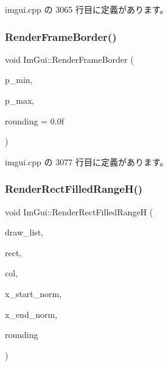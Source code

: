 imgui.\+cpp の 3065 行目に定義があります。

\mbox{\label{namespace_im_gui_adc76239c2006e66f8dab7638529a763d}} 
\subsubsection{\texorpdfstring{Render\+Frame\+Border()}{RenderFrameBorder()}}
{\footnotesize\ttfamily void Im\+Gui\+::\+Render\+Frame\+Border (\begin{DoxyParamCaption}\item[{\mbox{\hyperlink{struct_im_vec2}{Im\+Vec2}}}]{p\+\_\+min,  }\item[{\mbox{\hyperlink{struct_im_vec2}{Im\+Vec2}}}]{p\+\_\+max,  }\item[{float}]{rounding = {\ttfamily 0.0f} }\end{DoxyParamCaption})}



 imgui.\+cpp の 3077 行目に定義があります。

\mbox{\label{namespace_im_gui_af311762331bda4508b25e05f6afc7f45}} 
\subsubsection{\texorpdfstring{Render\+Rect\+Filled\+Range\+H()}{RenderRectFilledRangeH()}}
{\footnotesize\ttfamily void Im\+Gui\+::\+Render\+Rect\+Filled\+RangeH (\begin{DoxyParamCaption}\item[{\mbox{\hyperlink{struct_im_draw_list}{Im\+Draw\+List}} $\ast$}]{draw\+\_\+list,  }\item[{const \mbox{\hyperlink{struct_im_rect}{Im\+Rect}} \&}]{rect,  }\item[{\mbox{\hyperlink{imgui_8h_a118cff4eeb8d00e7d07ce3d6460eed36}{Im\+U32}}}]{col,  }\item[{float}]{x\+\_\+start\+\_\+norm,  }\item[{float}]{x\+\_\+end\+\_\+norm,  }\item[{float}]{rounding }\end{DoxyParamCaption})}



